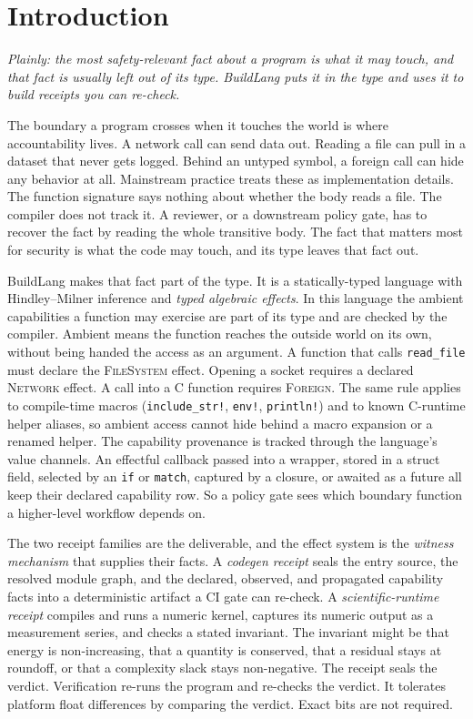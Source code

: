 \documentclass[11pt]{article}
\begin{document}
\section{Introduction}
\emph{Plainly: the most safety-relevant fact about a program is what it may touch, and that fact is usually left out of its type. BuildLang puts it in the type and uses it to build receipts you can re-check.}

The boundary a program crosses when it touches the world is where accountability lives. A network call can send data out. Reading a file can pull in a dataset that never gets logged. Behind an untyped symbol, a foreign call can hide any behavior at all. Mainstream practice treats these as implementation details. The function signature says nothing about whether the body reads a file. The compiler does not track it. A reviewer, or a downstream policy gate, has to recover the fact by reading the whole transitive body. The fact that matters most for security is what the code may touch, and its type leaves that fact out.

BuildLang makes that fact part of the type. It is a statically-typed language with Hindley--Milner inference and \emph{typed algebraic effects}. In this language the ambient capabilities a function may exercise are part of its type and are checked by the compiler. Ambient means the function reaches the outside world on its own, without being handed the access as an argument. A function that calls \texttt{read\_file} must declare the \textsc{FileSystem} effect. Opening a socket requires a declared \textsc{Network} effect. A call into a C function requires \textsc{Foreign}. The same rule applies to compile-time macros (\texttt{include\_str!}, \texttt{env!}, \texttt{println!}) and to known C-runtime helper aliases, so ambient access cannot hide behind a macro expansion or a renamed helper. The capability provenance is tracked through the language's value channels. An effectful callback passed into a wrapper, stored in a struct field, selected by an \texttt{if} or \texttt{match}, captured by a closure, or awaited as a future all keep their declared capability row. So a policy gate sees which boundary function a higher-level workflow depends on.

The two receipt families are the deliverable, and the effect system is the \emph{witness mechanism} that supplies their facts. A \emph{codegen receipt} seals the entry source, the resolved module graph, and the declared, observed, and propagated capability facts into a deterministic artifact a CI gate can re-check. A \emph{scientific-runtime receipt} compiles and runs a numeric kernel, captures its numeric output as a measurement series, and checks a stated invariant. The invariant might be that energy is non-increasing, that a quantity is conserved, that a residual stays at roundoff, or that a complexity slack stays non-negative. The receipt seals the verdict. Verification re-runs the program and re-checks the verdict. It tolerates platform float differences by comparing the verdict. Exact bits are not required.
\end{document}
